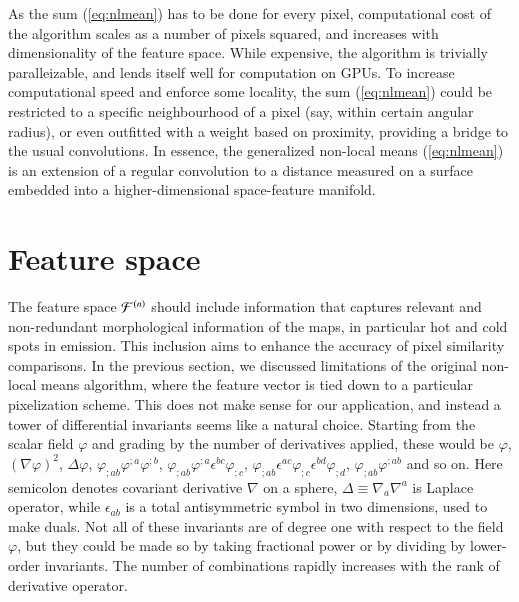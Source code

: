 \documentclass{aa}
\begin{document}
As the sum (\ref{eq:nlmean}) has to be done for every pixel, computational cost of the algorithm scales as a number of pixels squared, and increases with dimensionality of the feature space. While expensive, the algorithm is trivially paralleizable, and lends itself well for computation on GPUs. To increase computational speed and enforce some locality, the sum (\ref{eq:nlmean}) could be restricted to a specific neighbourhood of a pixel (say, within certain angular radius), or even outfitted with a weight based on proximity, providing a bridge to the usual convolutions. In essence, the generalized non-local means (\ref{eq:nlmean}) is an extension of a regular convolution to a distance measured on a surface embedded into a higher-dimensional space-feature manifold.

\section{Feature space}
\label{sec:feature}

The feature space ${{\cal F}^{(n)}}$ should include information that captures relevant and non-redundant morphological information of the maps, in particular hot and cold spots in emission. This inclusion aims to enhance the accuracy of pixel similarity comparisons. In the previous section, we discussed limitations of the original non-local means algorithm, where the feature vector is tied down to a particular pixelization scheme. This does not make sense for our application, and instead a tower of differential invariants seems like a natural choice. Starting from the scalar field $\varphi$ and grading by the number of derivatives applied, these would be $\varphi$, $(\nabla \varphi)^2$, $\Delta\varphi$, $\varphi_{;ab} \varphi^{;a} \varphi^{;b}$, $\varphi_{;ab} \varphi^{;a} \epsilon^{bc}\varphi_{;c}$, $\varphi_{;ab} \epsilon^{ac} \varphi_{;c} \epsilon^{bd}\varphi_{;d}$, $\varphi_{;ab}\varphi^{;ab}$ and so on. Here semicolon denotes covariant derivative $\nabla$ on a sphere, $\Delta\equiv\nabla_a\nabla^a$ is Laplace operator, while $\epsilon_{ab}$ is a total antisymmetric symbol in two dimensions, used to make duals. Not all of these invariants are of degree one with respect to the field $\varphi$, but they could be made so by taking fractional power or by dividing by lower-order invariants. The number of combinations rapidly increases with the rank of derivative operator. 
\end{document}
